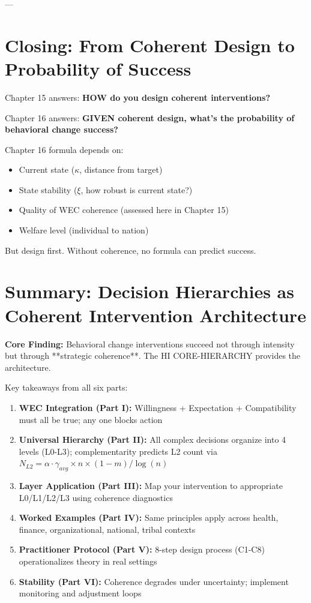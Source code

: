 \documentclass[11pt, a4paper]{article}
\begin{document}
---

\section*{Closing: From Coherent Design to Probability of Success}

Chapter 15 answers: \textbf{HOW do you design coherent interventions?}

Chapter 16 answers: \textbf{GIVEN coherent design, what's the probability of behavioral change success?}

Chapter 16 formula depends on:
\begin{itemize}[nosep]
    \item Current state ($\kappa$, distance from target)
    \item State stability ($\xi$, how robust is current state?)
    \item Quality of WEC coherence (assessed here in Chapter 15)
    \item Welfare level (individual to nation)
\end{itemize}

But design first. Without coherence, no formula can predict success.


\section{Summary: Decision Hierarchies as Coherent Intervention Architecture}\label{sec:ch15-summary}

\textbf{Core Finding:} Behavioral change interventions succeed not through intensity but through **strategic coherence**. The HI CORE-HIERARCHY provides the architecture.

Key takeaways from all six parts:

\begin{enumerate}[nosep]
\item \textbf{WEC Integration (Part I):} Willingness + Expectation + Compatibility must all be true; any one blocks action
\item \textbf{Universal Hierarchy (Part II):} All complex decisions organize into 4 levels (L0-L3); complementarity predicts L2 count via $N_{L2} = \alpha \cdot \gamma_{avg} \times n \times (1-m) / \log(n)$
\item \textbf{Layer Application (Part III):} Map your intervention to appropriate L0/L1/L2/L3 using coherence diagnostics
\item \textbf{Worked Examples (Part IV):} Same principles apply across health, finance, organizational, national, tribal contexts
\item \textbf{Practitioner Protocol (Part V):} 8-step design process (C1-C8) operationalizes theory in real settings
\item \textbf{Stability (Part VI):} Coherence degrades under uncertainty; implement monitoring and adjustment loops
\end{enumerate}
\end{document}
